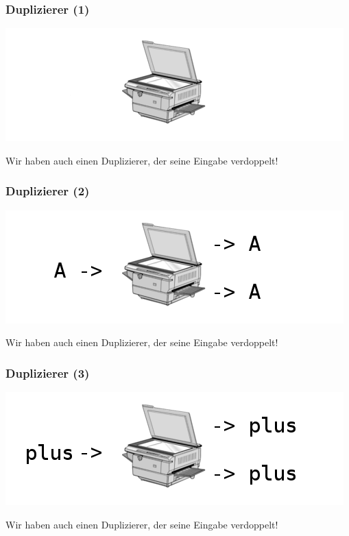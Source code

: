 \documentclass[aspectratio=43]{beamer}
\begin{document}

\begin{frame}
\frametitle{Duplizierer (1)}
\begin{center}
\includegraphics[scale=1.4]{images/copy_alone.png} 
\bigskip

Wir haben auch einen Duplizierer, der seine Eingabe verdoppelt!
\end{center}
\end{frame}


\begin{frame}
\frametitle{Duplizierer (2)}
\begin{center}
\includegraphics[scale=1.4]{images/erklaerung07.png}
\bigskip

Wir haben auch einen Duplizierer, der seine Eingabe verdoppelt!
\end{center}
\end{frame}


\begin{frame}
\frametitle{Duplizierer (3)}
\begin{center}
\includegraphics[scale=1.4]{images/erklaerung08.png}
\bigskip

Wir haben auch einen Duplizierer, der seine Eingabe verdoppelt!
\end{center}
\end{frame}
\end{document}
